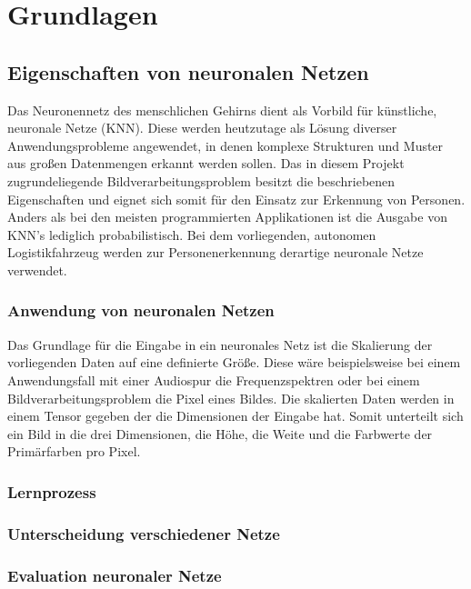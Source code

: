 \chapter{Grundlagen}
\label{ch: Grundlagen}
	
 
	
 	\section{Eigenschaften von neuronalen Netzen}
	\label{sec: ROS}
	
	Das Neuronennetz des menschlichen Gehirns dient als Vorbild für künstliche, neuronale Netze (KNN). Diese werden heutzutage als Lösung diverser Anwendungsprobleme angewendet, in denen komplexe Strukturen und Muster aus großen Datenmengen erkannt werden sollen. Das in diesem Projekt zugrundeliegende Bildverarbeitungsproblem besitzt die beschriebenen Eigenschaften und eignet sich somit für den Einsatz zur Erkennung von Personen. Anders als bei den meisten programmierten Applikationen ist die Ausgabe von KNN's lediglich probabilistisch. Bei dem vorliegenden, autonomen Logistikfahrzeug werden zur Personenerkennung derartige neuronale Netze verwendet.
	
		\subsection{Anwendung von neuronalen Netzen}
		
			Das Grundlage für die Eingabe in ein neuronales Netz ist die Skalierung der vorliegenden Daten auf eine definierte Größe. Diese wäre beispielsweise bei einem Anwendungsfall mit einer Audiospur die Frequenzspektren oder bei einem Bildverarbeitungsproblem die Pixel eines Bildes. Die skalierten Daten werden in einem Tensor gegeben der die Dimensionen der Eingabe hat. Somit unterteilt sich ein Bild in die drei Dimensionen, die Höhe, die Weite und die Farbwerte der Primärfarben pro Pixel. 
	
		\subsection{Lernprozess}
		
		\subsection{Unterscheidung verschiedener Netze}
		
		\subsection{Evaluation neuronaler Netze}
			
